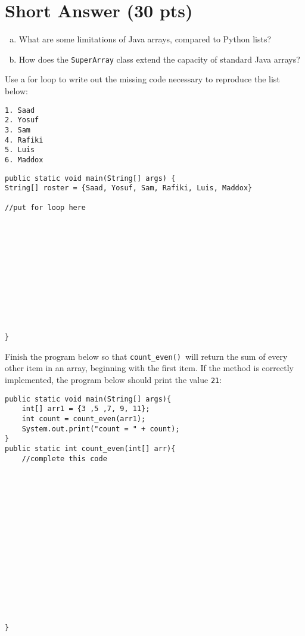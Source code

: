 \documentclass{exam}
\begin{document}
\section*{Short Answer (30 pts)}
\begin{center}
\end{center}
\begin{questions}
\question

\begin{enumerate}[a.]
\item What are some limitations of Java arrays, compared to Python lists?
 \fillwithlines{4cm}
\item How does the \texttt{SuperArray} class extend the capacity of standard Java arrays?
 \fillwithlines{4cm}
\end{enumerate}


\question

Use a for loop to write out the missing code necessary to reproduce the list below:


\begin{lstlisting}
1. Saad 
2. Yosuf
3. Sam 
4. Rafiki
5. Luis
6. Maddox
\end{lstlisting}



\begin{lstlisting}
public static void main(String[] args) {
String[] roster = {Saad, Yosuf, Sam, Rafiki, Luis, Maddox}

//put for loop here 












}
\end{lstlisting}

\question

Finish the program below so that \texttt{count\_even() }will return the sum of every other item in an array, beginning with the first item. If the method is correctly implemented, the program below should print  the value \texttt{21}:

\begin{lstlisting}
public static void main(String[] args){
	int[] arr1 = {3 ,5 ,7, 9, 11};
	int count = count_even(arr1);
	System.out.print("count = " + count);
}
public static int count_even(int[] arr){
	//complete this code
	
	
	
	
	
	
	
	
	
	
	
	
	
	
	
	
}

\end{lstlisting}







\end{questions}
\end{document}
